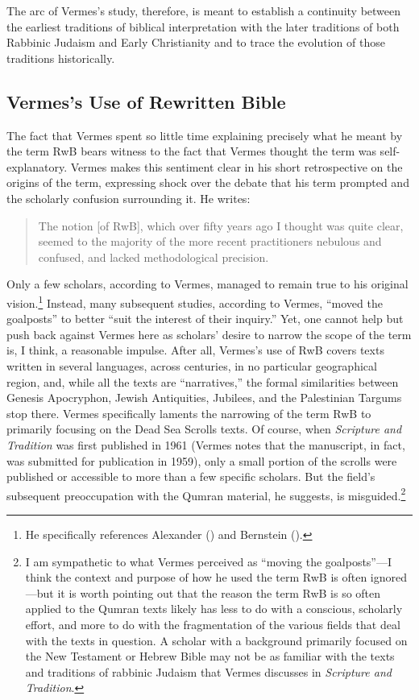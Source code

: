The arc of Vermes's study, therefore, is meant to establish a continuity
between the earliest traditions of biblical interpretation with the
later traditions of both Rabbinic Judaism and Early Christianity and to
trace the evolution of those traditions historically.

\hypertarget{vermess-use-of-rwb}{%
\subsection{Vermes's Use of Rewritten Bible}\label{vermess-use-of-rwb}}

The fact that Vermes spent so little time explaining precisely what he
meant by the term RwB bears witness to the fact that Vermes thought the
term was self-explanatory. Vermes makes this sentiment clear in his
short retrospective on the origins of the term, expressing shock over
the debate that his term prompted and the scholarly confusion
surrounding it. He writes:

\begin{quote}
The notion {[}of RwB{]}, which over fifty years ago I thought was quite
clear, seemed to the majority of the more recent practitioners nebulous
and confused, and lacked methodological
precision.\autocite[3]{vermes_zsengeller2014}
\end{quote}

Only a few scholars, according to Vermes, managed to remain true to his
original vision.\footnote{He specifically references Alexander
  (\autocite*{alexander_carson-williamson1988}) and Bernstein
  (\autocite*{bernstein_textus2005}).} Instead, many subsequent studies,
according to Vermes, ``moved the goalposts'' to better ``suit the
interest of their inquiry.''\autocite[4]{vermes_zsengeller2014} Yet, one
cannot help but push back against Vermes here as scholars' desire to
narrow the scope of the term is, I think, a reasonable impulse. After
all, Vermes's use of RwB covers texts written in several languages,
across centuries, in no particular geographical region, and, while all
the texts are ``narratives,'' the formal similarities between
Genesis Apocryphon, Jewish Antiquities, Jubilees, and the
Palestinian Targums stop there. Vermes specifically laments the
narrowing of the term RwB to primarily focusing on the Dead Sea Scrolls
texts. Of course, when \emph{Scripture and Tradition} was first
published in 1961 (Vermes notes that the manuscript, in fact, was
submitted for publication in 1959), only a small portion of the scrolls
were published or accessible to more than a few specific scholars. But
the field's subsequent preoccupation with the Qumran material, he
suggests, is misguided.\footnote{I am sympathetic to what Vermes
  perceived as ``moving the goalposts''---I think the context and
  purpose of how he used the term RwB is often ignored---but it is worth
  pointing out that the reason the term RwB is so often applied to the
  Qumran texts likely has less to do with a conscious, scholarly effort,
  and more to do with the fragmentation of the various fields that deal
  with the texts in question. A scholar with a background primarily
  focused on the New Testament or Hebrew Bible may not be as familiar
  with the texts and traditions of rabbinic Judaism that Vermes
  discusses in \emph{Scripture and Tradition}.}

